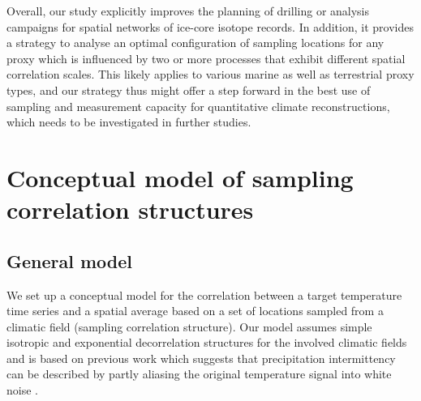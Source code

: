 \documentclass[cp, manuscript]{copernicus}
\begin{document}
Overall, our study explicitly improves the planning of drilling or analysis
campaigns for spatial networks of ice-core isotope records. In addition, it
provides a strategy to analyse an optimal configuration of sampling locations
for any proxy which is influenced by two or more processes that exhibit
different spatial correlation scales. This likely applies to various marine as
well as terrestrial proxy types, and our strategy thus might offer a step
forward in the best use of sampling and measurement capacity for quantitative
climate reconstructions, which needs to be investigated in further studies.


\appendix

\section{Conceptual model of sampling correlation structures}
\label{app:concept.model}

\subsection{General model}
\label{app:concept.model.general}

We set up a conceptual model for the correlation between a target temperature
time series and a spatial average based on a set of locations sampled from a
climatic field (sampling correlation structure). Our model assumes simple
isotropic and exponential decorrelation structures for the involved climatic
fields and is based on previous work which suggests that precipitation
intermittency can be described by partly aliasing the original temperature
signal into white noise \citep{Laepple2018}.
\end{document}
